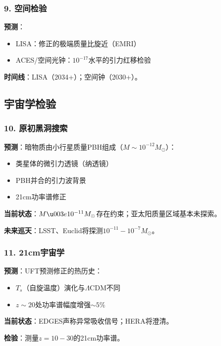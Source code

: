 \subsubsection{9. 空间检验}

\begin{test}[LISA和空间原子钟]
\textbf{预测}：
\begin{itemize}
    \item LISA：修正的极端质量比旋近（EMRI）
    \item ACES/空间光钟：$10^{-17}$水平的引力红移检验
\end{itemize}

\textbf{时间线}：LISA（2034+）；空间钟（2030+）。
\end{test}

\subsection{宇宙学检验}

\subsubsection{10. 原初黑洞搜索}

\begin{test}[微引力透镜和引力波搜索]
\textbf{预测}：暗物质由小行星质量PBH组成（$M \sim 10^{-12} M_\odot$）：
\begin{itemize}
    \item 类星体的微引力透镜（纳透镜）
    \item PBH并合的引力波背景
    \item 21cm功率谱修正
\end{itemize}

\textbf{当前状态}：$M \u003e 10^{-11} M_\odot$存在约束；亚太阳质量区域基本未探索。

\textbf{未来巡天}：LSST、Euclid将探测$10^{-11} - 10^{-7} M_\odot$。
\end{test}

\subsubsection{11. 21cm宇宙学}

\begin{test}
\textbf{预测}：UFT预测修正的热历史：
\begin{itemize}
    \item $T_s$（自旋温度）演化与$\Lambda$CDM不同
    \item $z \sim 20$处功率谱幅度增强$\sim 5\%$
\end{itemize}

\textbf{当前状态}：EDGES声称异常吸收信号；HERA将澄清。

\textbf{检验}：测量$z = 10-30$的21cm功率谱。
\end{test}

